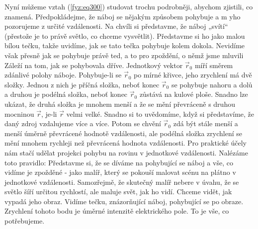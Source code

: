     Nyní můžeme vztah (\ref{fyz:eq300}) studovat trochu podrobněji, abychom zjistili, co znamená. 
    Předpokládejme, že náboj se nějakým způsobem pohybuje a m yho pozorujeme z určité vzdálenosti. 
    Na chvíli si představme, že náboj „svítí“ (přestože je to právě světlo, co chceme vysvětlit). 
    Představme si ho jako malou bílou tečku, takže uvidíme, jak se tato tečka pohybuje kolem 
    dokola. Nevidíme však přesně jak se pohybuje právě ted, a to pro zpoždění, o němž jsme mluvili 
    Záleží na tom, jak se pohybovala dříve. Jednotkový vektor \(\vec{r}_0\) míří směrem zdánlivé 
    polohy náboje. Pohybuje-li se \(\vec{r}_0\) po mírné křivce, jeho zrychlení má dvě složky. 
    Jednou z nich je příčná složka, neboť konec \(\vec{r}_0\) se pohybuje nahoru a dolů a druhou je 
    podélná složka, neboť konec \(\vec{r}_0\) zůstává na kulové ploše. Snadno lze ukázat, že druhá 
    složka je mnohem menší a že se mění převráceně s druhou mocninou \(\vec{r}\), je-li \(\vec{r}\) 
    velmi velké. Snadno si to uvědomíme, když si představíme, že daný zdroj vzdalujeme více a více. 
    Potom se chvění \(\vec{r}_0\) zdá být stále menší a menší úměrně převrácené hodnotě 
    vzdálenosti, ale podélná složka zrychlení se mění mnohem rychleji než převrácená hodnota 
    vzdálenosti. Pro praktické účely nám stačí udělat projekci pohybu na rovinu v jednotkové 
    vzdálenosti. Nalézáme toto pravidlo: Představme si, že se díváme na pohybující se náboj a vše, 
    co vidíme je zpožděné - jako malíř, který se pokouší malovat scénu na plátno v jednotkové 
    vzdálenosti. Samozřejmě, že skutečný malíř nebere v úvahu, že se světlo šíří určitou rychlostí, 
    ale maluje svět, jak ho vidí. Chceme vidět, jak vypadá jeho obraz. Vidíme tečku, znázorňující 
    náboj, pohybující se po obraze. Zrychlení tohoto bodu je úměrné intenzitě elektrického pole. To 
    je vše, co potřebujeme.
    
